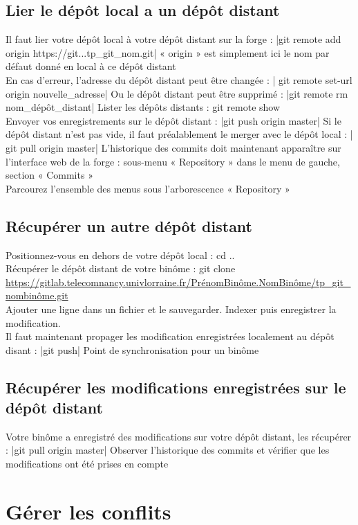 \subsection{Lier le dépôt local a un dépôt distant}
Il faut lier votre dépôt local à votre dépôt distant sur la forge :
|git remote add origin 
https://git...tp_git_nom.git|
 « origin » est simplement ici le nom par défaut donné en local à ce dépôt distant\\
  En cas d'erreur, l'adresse du dépôt distant peut être changée :
| git remote set-url origin nouvelle_adresse|
Ou le dépôt distant peut être supprimé : |git remote rm nom_dépôt_distant|
Lister les dépôts distants : git remote show\\
Envoyer vos enregistrements sur le dépôt distant : |git push origin master|
 Si le dépôt distant n'est pas vide, il faut préalablement le merger avec le dépôt local :
| git pull origin master|
L'historique des commits doit maintenant apparaître sur l'interface web de la forge : sous-menu
« Repository » dans le menu de gauche, section « Commits »\\
Parcourez l'ensemble des menus sous l’arborescence « Repository »
\subsection{Récupérer un autre dépôt distant}
Positionnez-vous en dehors de votre dépôt local : cd ..\\
 Récupérer le dépôt distant de votre binôme : git clone \url{https://gitlab.telecomnancy.univlorraine.fr/PrénomBinôme.NomBinôme/tp_git_nombinôme.git}\\
 Ajouter une ligne dans un fichier et le sauvegarder. Indexer puis enregistrer la modification.\\
  Il faut maintenant propager les modification enregistrées localement au dépôt disant :
|git push|
Point de synchronisation pour un binôme
\subsection{Récupérer les modifications enregistrées sur le dépôt distant}
Votre binôme a enregistré des modifications sur votre dépôt distant, les récupérer :
|git pull origin master|
Observer l'historique des commits et vérifier que les modifications ont été prises en compte
\section{Gérer les conflits}
